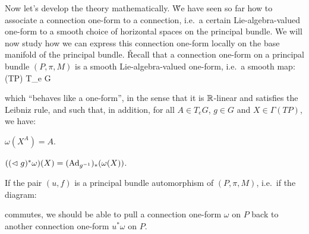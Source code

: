 Now let's develop the theory mathematically. \v

We have seen so far how to associate a connection one-form to a connection, i.e.\ a certain Lie-algebra-valued
one-form to a smooth choice of horizontal spaces on the principal bundle. We will now study how we can express this
connection one-form locally on the base manifold of the principal bundle. \v

Recall that a connection one-form on a principal bundle $(P,\pi,M)$ is a smooth Lie-algebra-valued one-form, i.e.\ a
smooth map:
\bse
\omega\cl \Gamma(TP) \xrightarrow{\sim} T_e G
\ese

which ``behaves like a one-form'', in the sense that it is $\mathbb{R}$-linear and satisfies the Leibniz rule, and such that,
in addition, for all $A\in T_e G$, $g\in G$ and $X\in \Gamma(TP)$, we have:
\ben[label=\roman*)]
\item $\omega(X^A)=A$.
\item $((\vartriangleleft g)^*\omega)(X)=(\operatorname{Ad}_{g^{-1}})_*(\omega(X))$.
\een

If the pair $(u,f)$ is a principal bundle automorphism of $(P,\pi,M)$, i.e.\ if the diagram:

\vspace{10pt}

\bse
{}
\ese

\vspace{10pt}

commutes, we should be able to pull a connection one-form $\omega$ on $P$ back to another connection one-form
$u^*\omega$ on $P$.

\vspace{10pt}

\bse
{}
\ese

\vspace{10pt}

